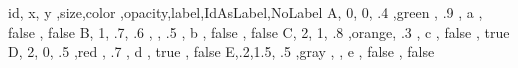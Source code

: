 id, x, y ,size,color ,opacity,label,IdAsLabel,NoLabel
A, 0, 0, .4 ,green , .9 , a , false , false
B, 1, .7, .6 , , .5 , b , false , false
C, 2, 1, .8 ,orange, .3 , c , false , true
D, 2, 0, .5 ,red , .7 , d , true , false
E,.2,1.5, .5 ,gray , , e , false , false